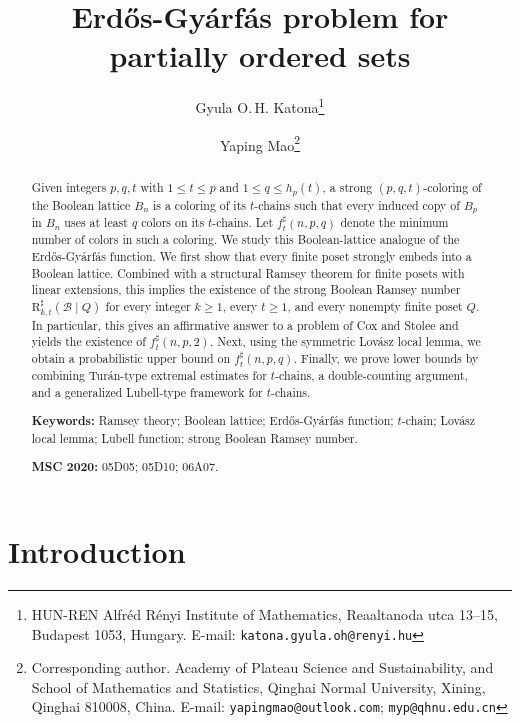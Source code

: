 \documentclass[twoside,12pt]{article}
\begin{document}
\title{\textbf{Erd\H{o}s-Gy\'{a}rf\'{a}s problem for partially ordered sets}}

\author{
Gyula O.\,H. Katona\thanks{HUN-REN Alfr\'ed R\'enyi Institute of Mathematics, Reaaltanoda utca 13--15, Budapest 1053, Hungary. E-mail: \texttt{katona.gyula.oh@renyi.hu}}
\and
Yaping Mao\thanks{Corresponding author. Academy of Plateau Science and Sustainability, and School of Mathematics and Statistics, Qinghai Normal University, Xining, Qinghai 810008, China. E-mail: \texttt{yapingmao@outlook.com}; \texttt{myp@qhnu.edu.cn}}
}

\date{}

\maketitle
\begin{abstract}
Given integers $p,q,t$ with $1 \le t \le p$ and $1 \le q \le h_p(t)$, a strong $(p,q,t)$-coloring of the Boolean lattice $B_n$ is a coloring of its $t$-chains such that every induced copy of $B_p$ in $B_n$ uses at least $q$ colors on its $t$-chains. Let $f_t^{\sharp}(n,p,q)$ denote the minimum number of colors in such a coloring. We study this Boolean-lattice analogue of the Erd\H{o}s-Gy\'{a}rf\'{a}s function.
We first show that every finite poset strongly embeds into a Boolean lattice. Combined with a structural Ramsey theorem for finite posets with linear extensions, this implies the existence of the strong Boolean Ramsey number $\mathrm{R}^{\sharp}_{k,t}(\mathcal{B}\mid Q)$ for every integer $k\ge1$, every $t\ge1$, and every nonempty finite poset $Q$. In particular, this gives an affirmative answer to a problem of Cox and Stolee and yields the existence of $f_t^{\sharp}(n,p,2)$.
Next, using the symmetric Lov\'asz local lemma, we obtain a probabilistic upper bound on $f_t^{\sharp}(n,p,q)$. Finally, we prove lower bounds by combining Tur\'an-type extremal estimates for $t$-chains, a double-counting argument, and a generalized Lubell-type framework for $t$-chains.

\noindent\textbf{Keywords:}
Ramsey theory; Boolean lattice; Erd\H{o}s-Gy\'{a}rf\'{a}s function; $t$-chain; Lov\'asz local lemma; Lubell function; strong Boolean Ramsey number.

\medskip
\noindent\textbf{MSC 2020:}
05D05; 05D10; 06A07.
\end{abstract}
\section{Introduction}
\end{document}
